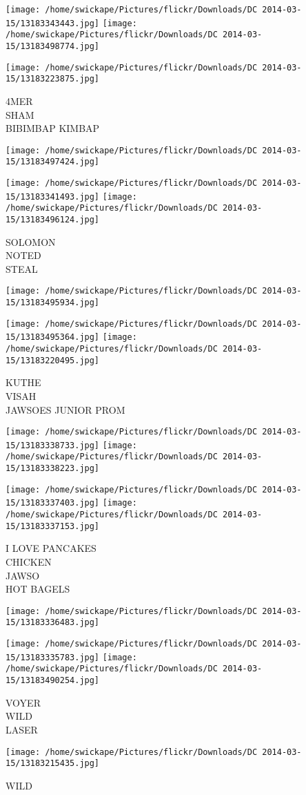 \documentclass[10pt,letterpaper]{article}
\begin{document}
\texttt{[image: /home/swickape/Pictures/flickr/Downloads/DC 2014-03-15/13183343443.jpg]}
\texttt{[image: /home/swickape/Pictures/flickr/Downloads/DC 2014-03-15/13183498774.jpg]}

\texttt{[image: /home/swickape/Pictures/flickr/Downloads/DC 2014-03-15/13183223875.jpg]}

4MER\\
SHAM\\
BIBIMBAP KIMBAP
\pagebreak

\texttt{[image: /home/swickape/Pictures/flickr/Downloads/DC 2014-03-15/13183497424.jpg]}

\vspace{0.25in}
\texttt{[image: /home/swickape/Pictures/flickr/Downloads/DC 2014-03-15/13183341493.jpg]}
\texttt{[image: /home/swickape/Pictures/flickr/Downloads/DC 2014-03-15/13183496124.jpg]}

SOLOMON\\
NOTED\\
STEAL
\pagebreak

\texttt{[image: /home/swickape/Pictures/flickr/Downloads/DC 2014-03-15/13183495934.jpg]}

\vspace{0.25in}
\texttt{[image: /home/swickape/Pictures/flickr/Downloads/DC 2014-03-15/13183495364.jpg]}
\texttt{[image: /home/swickape/Pictures/flickr/Downloads/DC 2014-03-15/13183220495.jpg]}

KUTHE\\
VISAH\\
JAWSOES JUNIOR PROM
\pagebreak

\texttt{[image: /home/swickape/Pictures/flickr/Downloads/DC 2014-03-15/13183338733.jpg]}
\texttt{[image: /home/swickape/Pictures/flickr/Downloads/DC 2014-03-15/13183338223.jpg]}

\texttt{[image: /home/swickape/Pictures/flickr/Downloads/DC 2014-03-15/13183337403.jpg]}
\texttt{[image: /home/swickape/Pictures/flickr/Downloads/DC 2014-03-15/13183337153.jpg]}

I LOVE PANCAKES\\
CHICKEN\\
JAWSO\\
HOT BAGELS
\pagebreak

\texttt{[image: /home/swickape/Pictures/flickr/Downloads/DC 2014-03-15/13183336483.jpg]}

\vspace{0.25in}
\texttt{[image: /home/swickape/Pictures/flickr/Downloads/DC 2014-03-15/13183335783.jpg]}
\texttt{[image: /home/swickape/Pictures/flickr/Downloads/DC 2014-03-15/13183490254.jpg]}

VOYER\\
WILD\\
LASER
\pagebreak

\texttt{[image: /home/swickape/Pictures/flickr/Downloads/DC 2014-03-15/13183215435.jpg]}

WILD
\pagebreak
\end{document}
